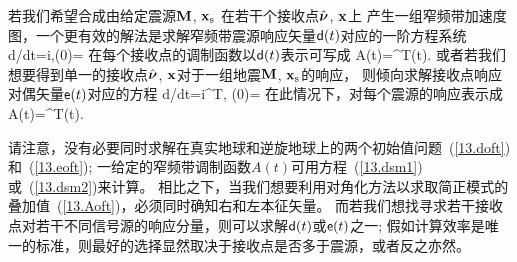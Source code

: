 {{{%

若我们希望合成由给定震源$\mbox{${\bf M}$}$, $\mbox{${\bf x}$}_{\rm s}$ 在若干个接收点$\mbox{$\hat{\mbox{\boldmath $\bf \nu$}}$}$, $\mbox{${\bf x}$}$上
产生一组窄频带加速度图，一个更有效的解法是求解窄频带震源响应矢量$\mbox{${\sf d}$}(t)$对应的一阶方程系统
\eq \label{13.doft}
d\hspace{0.1 mm}\ssd/\hspace{-0.2 mm}dt=i\ssH\ssd,\qquad\ssd(0)=\ssv
\en
%
%
在每个接收点的调制函数以$\mbox{${\sf d}$}(t)$表示可写成
\eq \label{13.dsm1}
A(t)=\ssu^{\rm T}\ssd(t).
\en
或者若我们想要得到单一的接收点$\mbox{$\hat{\mbox{\boldmath $\bf \nu$}}$}$, $\mbox{${\bf x}$}$对于一组地震$\mbox{${\bf M}$}$, $\mbox{${\bf x}$}_{\rm s}$的响应，
则倾向求解接收点响应对偶矢量$\mbox{${\sf e}$}(t)$对应的方程
\eq \label{13.eoft}
d\hspace{0.2 mm}\sse/\hspace{-0.2 mm}dt=i\ssH^{\rm T}\sse,
\qquad\sse(0)=\ssu
\en
%
%
在此情况下，对每个震源的响应表示成
\eq \label{13.dsm2}
A(t)=\sse^{\rm T}(t)\ssv.
\en

请注意，没有必要同时求解在真实地球和逆旋地球上的两个初始值问题~(\ref{13.doft})和~(\ref{13.eoft});
一给定的窄频带调制函数$A(t)$可用方程~(\ref{13.dsm1})或~(\ref{13.dsm2})来计算。
相比之下，当我们想要利用对角化方法以求取简正模式的叠加值~(\ref{13.Aoft})，必须同时确知右和左本征矢量。
而若我们想找寻求若干接收点对若干不同信号源的响应分量，则可以求解$\mbox{${\sf d}$}(t)$或$\mbox{${\sf e}$}(t)$之一;
假如计算效率是唯一的标准，则最好的选择显然取决于接收点是否多于震源，或者反之亦然。

}}}
